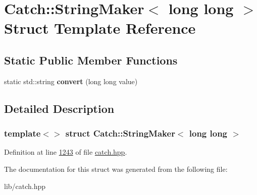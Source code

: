 \hypertarget{structCatch_1_1StringMaker_3_01long_01long_01_4}{}\section{Catch\+::String\+Maker$<$ long long $>$ Struct Template Reference}
\label{structCatch_1_1StringMaker_3_01long_01long_01_4}
\subsection*{Static Public Member Functions}
\begin{DoxyCompactItemize}
\item 
\mbox{\label{structCatch_1_1StringMaker_3_01long_01long_01_4_a7a58929dca2a14c576d7d6d08bc615d2}} 
static std\+::string {\bfseries convert} (long long value)
\end{DoxyCompactItemize}


\subsection{Detailed Description}
\subsubsection*{template$<$$>$\newline
struct Catch\+::\+String\+Maker$<$ long long $>$}



Definition at line \mbox{\hyperlink{catch_8hpp_source_l01243}{1243}} of file \mbox{\hyperlink{catch_8hpp_source}{catch.\+hpp}}.



The documentation for this struct was generated from the following file\+:\begin{DoxyCompactItemize}
\item 
lib/catch.\+hpp\end{DoxyCompactItemize}
